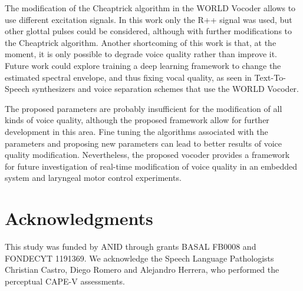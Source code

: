 \documentclass[final,5p,times,twocolumn]{elsarticle}
\begin{document}
The modification of the Cheaptrick algorithm in the WORLD Vocoder allows to use different excitation signals. In this work only the R++ signal was used, but other glottal pulses could be considered, although with further modifications to the Cheaptrick algorithm. Another shortcoming of this work is that, at the moment, it is only possible to degrade voice quality rather than improve it. Future work could explore training a deep learning framework to change the estimated spectral envelope, and thus fixing vocal quality, as seen in Text-To-Speech synthesizers\cite{mozillatts} and voice separation schemes\cite{Blaauw2017} that use the WORLD Vocoder.

The proposed parameters are probably insufficient for the modification of all kinds of voice quality, although the proposed framework allow for further development in this area. Fine tuning the algorithms associated with the parameters and proposing new parameters can lead to better results of voice quality modification. Nevertheless, the proposed vocoder provides a framework for future investigation of real-time modification of voice quality in an embedded system and laryngeal motor control experiments.


\section{Acknowledgments}

This study was funded by ANID through grants BASAL FB0008 and FONDECYT 1191369. We acknowledge the Speech Language Pathologists Christian Castro, Diego Romero and Alejandro Herrera, who performed the perceptual CAPE-V assessments.

 

\end{document}
